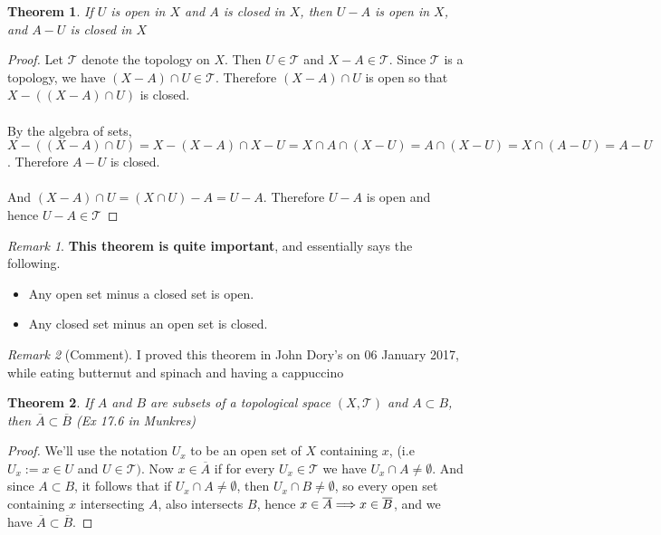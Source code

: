 \documentclass{article}
\newtheorem{theorem}{Theorem}[section]
\theoremstyle{remark}
\newtheorem*{remark}{Remark}
\theoremstyle{definition}
\newcommand{\simplies}{\DOTSB\Longrightarrow}
\begin{document}
\newpage

\begin{theorem}
If $U$ is open in $X$ and $A$ is closed in $X$, then $U-A$ is open in $X$, and $A-U$ is closed in $X$
\end{theorem}

\begin{proof}
Let $\mathcal{T}$ denote the topology on $X$. Then $U \in \mathcal{T}$ and $X-A \in \mathcal{T}$. Since $\mathcal{T}$ is a topology, we have $(X-A) \cap U \in \mathcal{T}$. Therefore $(X-A) \cap U$ is open so that $X - ((X-A) \cap U)$ is closed. \\ \\ By the algebra of sets, $X - ((X-A) \cap U) = X - (X-A) \cap X-U = X \cap A \cap (X-U) = A \cap (X-U) = X \cap (A-U) = A- U$. Therefore $A-U$ is closed. 
\\ \\
And $(X-A) \cap U = (X \cap U) - A = U-A$. Therefore $U-A$ is open and hence $U-A \in \mathcal{T}$
\end{proof}

\begin{remark}
\textbf{This theorem is quite important}, and essentially says the following. 
\begin{itemize}
  \item Any open set minus a closed set is open.
  \item Any closed set minus an open set is closed.
\end{itemize}
\end{remark}

\medskip

\begin{remark}[Comment]
I proved this theorem in John Dory's on 06 January 2017, while eating butternut and spinach and having a cappuccino
\end{remark}
\bigskip
\begin{theorem}
If $A$ and $B$ are subsets of a topological space $(X, \mathcal{T})$ and $A \subset B$, then $\overline{A} \subset \overline{B}$ (Ex 17.6 in Munkres)
\end{theorem}

\begin{proof}
We'll use the notation $U_x$ to be an open set of $X$ containing $x$, (i.e $U_x := x \in U$ and $U \in \mathcal{T})$. Now $x \in \overline{A}$ if for every $U_x \in \mathcal{T}$ we have $U_x \cap A \neq \emptyset$. And since $A \subset B$, it follows that if $U_x \cap A \neq \emptyset$, then $U_x \cap B \neq \emptyset$, so every open set containing $x$ intersecting $A$, also intersects $B$, hence $x \in \overline{A} \simplies x \in \overline{B}$, and we have $\overline{A} \subset \overline{B}.$
\end{proof}
\end{document}
